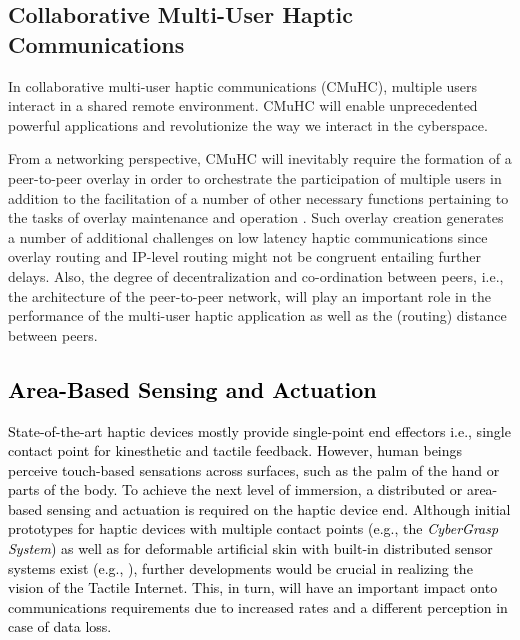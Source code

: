 \documentclass[journal]{IEEEtran}
\begin{document}
\subsection{Collaborative Multi-User Haptic Communications}
In collaborative multi-user haptic communications (CMuHC), multiple users interact in a shared remote environment. CMuHC will enable unprecedented powerful applications and revolutionize the way we interact in the cyberspace.


From a networking perspective, CMuHC will inevitably require the formation of a peer-to-peer overlay in order to orchestrate the participation of multiple users in addition to the facilitation of a number of other necessary functions pertaining to the tasks of overlay maintenance and operation \cite{overlay}.  Such overlay creation generates a number of additional challenges on low latency haptic communications since overlay routing and IP-level routing might not be congruent entailing further delays. Also, the degree of decentralization and co-ordination between peers, i.e., the architecture of the peer-to-peer network, will play an important role in the performance of the multi-user haptic application as well as the (routing) distance between peers.


\subsection{\textcolor{black}{Area-Based Sensing and Actuation}}

\textcolor{black}{State-of-the-art haptic devices mostly provide single-point end effectors i.e., single contact point for kinesthetic and tactile feedback. However, human beings perceive touch-based sensations across surfaces, such as the palm of the hand or parts of the body. To achieve the next level of immersion, a distributed or area-based sensing and actuation is required on the haptic device end. Although initial prototypes for haptic devices with multiple contact points (e.g., the \emph{CyberGrasp System}) as well as for deformable artificial skin with built-in distributed sensor systems exist (e.g., \cite{softskin}), further developments would be crucial in realizing the vision of the Tactile Internet. This, in turn, will have an important impact onto communications requirements due to increased rates and a different perception in case of data loss.}
\end{document}
